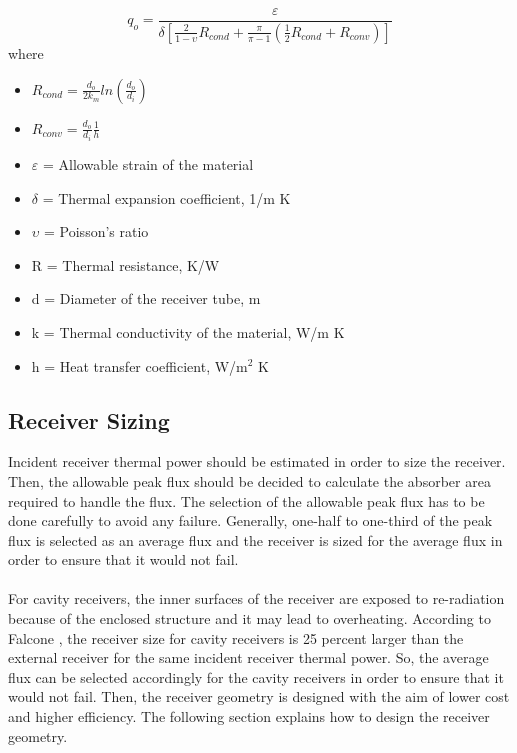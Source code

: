 \begin{equation}
{q_o} = \frac{\varepsilon} {\delta [\frac{2}{1-\upsilon}R_{cond} + \frac{\pi}{\pi -1} (\frac{1}{2}R_{cond} + R_{conv})]}
\end{equation}
where
\begin{itemize}
	\item $R_{cond} = \frac{d_o}{2k_m}ln(\frac{d_o}{d_i})$
	\item $R_{conv} = \frac{d_o}{d_i} \frac{1}{h}$
	\item $\varepsilon$ = Allowable strain of the material
	\item $\delta$ = Thermal expansion coefficient, 1/m K
	\item $\upsilon$ = Poisson's ratio
	\item R = Thermal resistance, K/W
	\item d = Diameter of the receiver tube, m
	\item k = Thermal conductivity of the material, W/m K
	\item h = Heat transfer coefficient, W/m$^2$ K
	\end{itemize}
\subsection{Receiver Sizing}
Incident receiver thermal power should be estimated in order to size the receiver. Then, the allowable peak flux should be decided to calculate the absorber area required to handle the flux. The selection of the allowable peak flux has to be done carefully to avoid any failure. Generally, one-half to one-third of the peak flux \cite{Stine.1985} is selected as an average flux and the receiver is sized for the average flux in order to ensure that it would not fail. \\\\
For cavity receivers, the inner surfaces of the receiver are exposed to re-radiation because of the enclosed structure and it may lead to overheating. According to Falcone \cite{Falcone.1986}, the receiver size for cavity receivers is 25 percent larger than the external receiver for the same incident receiver thermal power. So, the average flux can be selected accordingly for the cavity receivers in order to ensure that it would not fail. Then, the receiver geometry is designed with the aim of lower cost and higher efficiency. The following section explains how to design the receiver geometry.
